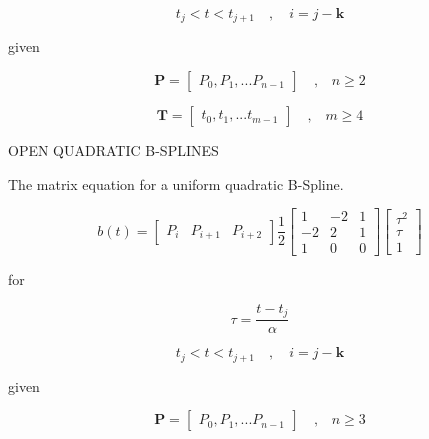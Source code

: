 \documentclass{article}
\begin{document}
    \begin{equation}
        t_j < t < t_{j+1} \quad , \quad i = j-\textbf{k}
    \end{equation}
    
    given
    
    \begin{equation}
    \textbf{P} = \begin{bmatrix} P_0, P_1, ... P_{n-1} \end{bmatrix} \quad \text{,} \quad n \geq 2
    \end{equation}
    
    \begin{equation}
        \textbf{T} = \begin{bmatrix} t_0, t_1, ... t_{m-1} \end{bmatrix} \quad \text{,} \quad m \geq 4
    \end{equation}
  
\hspace{1cm}

OPEN QUADRATIC B-SPLINES
\hfill \break

    The matrix equation for a uniform quadratic B-Spline.
    
    \begin{equation}
        b(t) = \begin{bmatrix} P_i & P_{i+1} & P_{i+2} \end{bmatrix} \frac{1}{2} \begin{bmatrix} 1 & -2 & 1 \\ -2 & 2 & 1 \\ 1 & 0 & 0
        \end{bmatrix} \begin{bmatrix} \tau^2 \\ \tau \\ 1 \end{bmatrix}
    \end{equation}
    
    for
    
    \begin{equation}
        \tau = \frac{t-t_j}{\alpha}
    \end{equation}
    
    \begin{equation}
        t_j < t < t_{j+1} \quad , \quad i = j-\textbf{k}
    \end{equation}
    
    given
    
    \begin{equation}
    \textbf{P} = \begin{bmatrix} P_0, P_1, ... P_{n-1} \end{bmatrix} \quad \text{,} \quad n \geq 3
    \end{equation}
    
\end{document}
